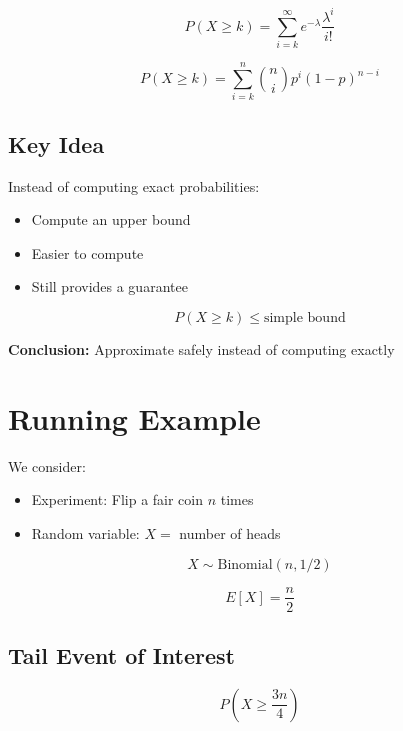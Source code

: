 \documentclass{article}
\begin{document}
\begin{equation}
P(X \geq k) = \sum_{i = k}^{\infty} e^{-\lambda} \frac{\lambda^i}{i!}
\end{equation}

\begin{equation}
P(X \geq k) = \sum_{i = k}^{n} \binom{n}{i} p^i (1 - p)^{n - i}
\end{equation}

\subsection{Key Idea}

Instead of computing exact probabilities:
\begin{itemize}
    \item Compute an upper bound
    \item Easier to compute
    \item Still provides a guarantee
\end{itemize}

\begin{equation}
P(X \geq k) \leq \text{simple bound}
\end{equation}

\textbf{Conclusion:}  
Approximate safely instead of computing exactly

\section{Running Example}

We consider:

\begin{itemize}
    \item Experiment: Flip a fair coin $n$ times
    \item Random variable: $X =$ number of heads
\end{itemize}

\begin{equation}
X \sim \text{Binomial}(n, 1/2)
\end{equation}

\begin{equation}
E[X] = \frac{n}{2}
\end{equation}

\subsection{Tail Event of Interest}

\begin{equation}
P\left(X \geq \frac{3n}{4}\right)
\end{equation}
\end{document}
